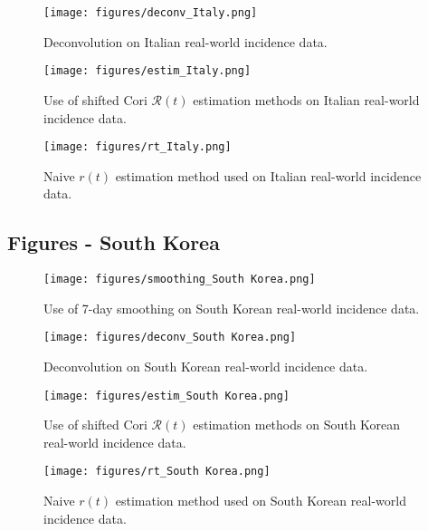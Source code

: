 \documentclass{article}
\newcommand{\nR}{\mathscr{R}}
\newcommand{\nr}{r}
\begin{document}
\begin{figure}
    \centering
    \texttt{[image: figures/deconv\_Italy.png]}
    \caption{Deconvolution on Italian real-world incidence data.}
    \label{fig:my_label}
\end{figure}

\begin{figure}[h!]
    \centering
    \texttt{[image: figures/estim\_Italy.png]}
    \caption{Use of shifted Cori $\nR(t)$ estimation methods on Italian real-world incidence data.}
    \label{fig:my_label}
\end{figure}

\clearpage
\begin{figure}[h!]
    \centering
    \texttt{[image: figures/rt\_Italy.png]}
    \caption{Naive $\nr(t)$ estimation method used on Italian real-world incidence data.}
    \label{fig:my_label}
\end{figure}

\clearpage
\subsection{Figures - South Korea}
\begin{figure}[h!]
    \centering
    \texttt{[image: figures/smoothing\_South Korea.png]}
    \caption{Use of 7-day smoothing on South Korean real-world incidence data.}
    \label{fig:my_label}
\end{figure}

\begin{figure}
    \centering
    \texttt{[image: figures/deconv\_South Korea.png]}
    \caption{Deconvolution on South Korean real-world incidence data.}
    \label{fig:my_label}
\end{figure}

\begin{figure}[h!]
    \centering
    \texttt{[image: figures/estim\_South Korea.png]}
    \caption{Use of shifted Cori $\nR(t)$ estimation methods on South Korean real-world incidence data.}
    \label{fig:my_label}
\end{figure}

\clearpage
\begin{figure}[h!]
    \centering
    \texttt{[image: figures/rt\_South Korea.png]}
    \caption{Naive $\nr(t)$ estimation method used on South Korean real-world incidence data.}
    \label{fig:my_label}
\end{figure}
\end{document}
